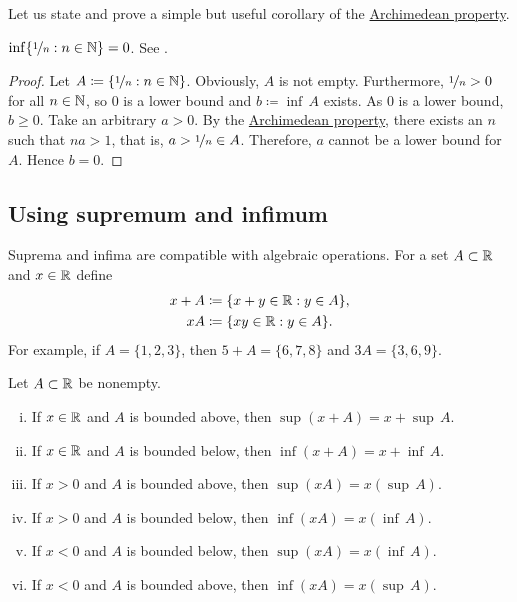 Let us state and prove a simple but useful corollary of the
\hyperref[thm:arch:i]{Archimedean property}.

\begin{cor}
$\inf \{ \nicefrac{1}{n} : n \in {\mathbb{N}} \} = 0$.
See .
\end{cor}

\begin{proof}
Let $A \coloneqq \{ \nicefrac{1}{n} : n \in {\mathbb{N}} \}$.  Obviously, $A$ is not empty.
Furthermore,
$\nicefrac{1}{n} > 0$ for all $n \in {\mathbb{N}}$, so $0$ is a lower bound
and $b \coloneqq \inf\, A$ exists.
As $0$ is a lower bound, $b \geq 0$.
Take an arbitrary $a > 0$.  By the
\hyperref[thm:arch:i]{Archimedean property}, there exists an $n$ such that
$na > 1$, that is, $a > \nicefrac{1}{n} \in A$.  Therefore,
$a$ cannot be a lower bound for $A$.  Hence $b=0$.
\end{proof}

\begin{myfigureht}
\caption{The set $\{ \nicefrac{1}{n} : n \in \N \}$ and its infimum $0$.\label{fig:oneovernset}}
\end{myfigureht}



\subsection{Using supremum and infimum}

Suprema and infima are
compatible with algebraic operations.  For a set $A \subset {\mathbb{R}}$ and
$x \in {\mathbb{R}}$ define
\begin{align*}
x + A & \coloneqq \{ x+y \in {\mathbb{R}} : y \in A \} , \\
xA & \coloneqq \{ xy \in {\mathbb{R}} : y \in A \} .
\end{align*}
For example, if $A = \{ 1,2,3 \}$, then $5+A = \{ 6,7,8 \}$ and $3A = \{ 3,6,9
\}$.

\begin{prop} \label{prop:supinfalg}
Let $A \subset {\mathbb{R}}$ be nonempty.
\begin{enumerate}[(i)]
\item If $x \in {\mathbb{R}}$ and $A$ is bounded above, then $\sup (x+A) = x + \sup\, A$.
\item If $x \in {\mathbb{R}}$ and $A$ is bounded below, then $\inf (x+A) = x + \inf\, A$.
\item If $x > 0$ and $A$ is bounded above, then $\sup (xA) = x ( \sup\, A )$.
\item If $x > 0$ and $A$ is bounded below, then $\inf (xA) = x ( \inf\, A )$.
\item If $x < 0$ and $A$ is bounded below, then $\sup (xA) = x ( \inf\, A )$.
\item If $x < 0$ and $A$ is bounded above, then $\inf (xA) = x ( \sup\, A )$.
\end{enumerate}
\end{prop}

